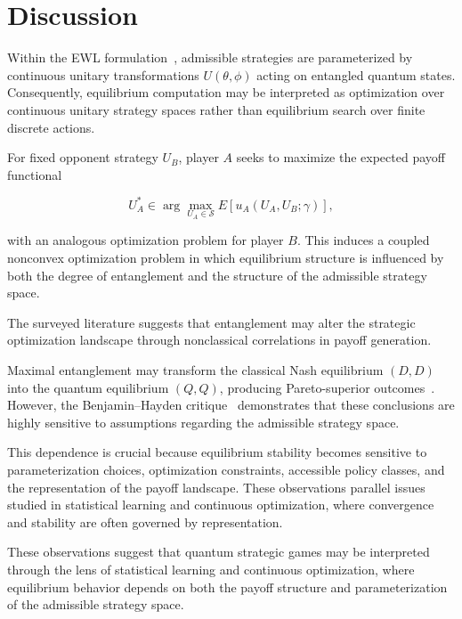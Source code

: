 \section{Discussion}

Within the EWL formulation~\cite{ewl}, admissible strategies are parameterized by continuous unitary transformations $U(\theta,\phi)$ acting on entangled quantum states. Consequently, equilibrium computation may be interpreted as optimization over continuous unitary strategy spaces rather than equilibrium search over finite discrete actions.

For fixed opponent strategy $U_B$, player $A$ seeks to maximize the expected payoff functional

\begin{equation}
	U_A^*
	\in
	\arg\max_{U_A \in \mathcal{S}}
	E[u_A(U_A,U_B;\gamma)],
\end{equation}

with an analogous optimization problem for player $B$. This induces a coupled nonconvex optimization problem in which equilibrium structure is influenced by both the degree of entanglement and the structure of the admissible strategy space.

The surveyed literature suggests that entanglement may alter the strategic optimization landscape through nonclassical correlations in payoff generation.

Maximal entanglement may transform the classical Nash equilibrium $(D,D)$ into the quantum equilibrium $(Q,Q)$, producing Pareto-superior outcomes~\cite{ewl}. However, the Benjamin--Hayden critique~\cite{benjamin} demonstrates that these conclusions are highly sensitive to assumptions regarding the admissible strategy space.

This dependence is crucial because equilibrium stability becomes sensitive to parameterization choices, optimization constraints, accessible policy classes, and the representation of the payoff landscape. These observations parallel issues studied in statistical learning and continuous optimization, where convergence and stability are often governed by representation.

These observations suggest that quantum strategic games may be interpreted through the lens of statistical learning and continuous optimization, where equilibrium behavior depends on both the payoff structure and parameterization of the admissible strategy space.